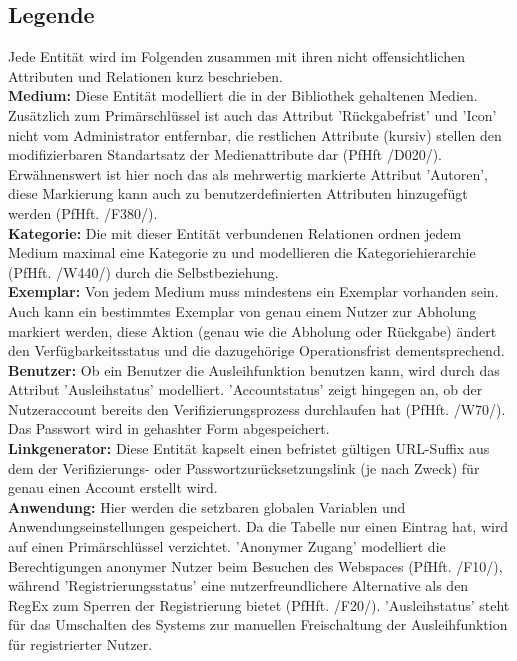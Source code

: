 \documentclass{article}
\begin{document}
\subsection{Legende}
Jede Entität wird im Folgenden zusammen mit ihren nicht offensichtlichen Attributen und Relationen kurz beschrieben.\\
\textbf{Medium:} Diese Entität modelliert die in der Bibliothek gehaltenen Medien. Zusätzlich zum Primärschlüssel ist auch das Attribut 'Rückgabefrist' und 'Icon' nicht vom Administrator entfernbar, die restlichen Attribute (kursiv) stellen den modifizierbaren Standartsatz der Medienattribute dar (PfHft /D020/). Erwähnenswert ist hier noch das als mehrwertig markierte Attribut 'Autoren', diese Markierung kann auch zu benutzerdefinierten Attributen hinzugefügt werden (PfHft. /F380/).\\
\textbf{Kategorie:} Die mit dieser Entität verbundenen Relationen ordnen jedem Medium maximal eine Kategorie zu und modellieren die Kategoriehierarchie (PfHft. /W440/) durch die Selbstbeziehung.\\
\textbf{Exemplar:} Von jedem Medium muss mindestens ein Exemplar vorhanden sein. Auch kann ein bestimmtes Exemplar von genau einem Nutzer zur Abholung markiert werden, diese Aktion (genau wie die Abholung oder Rückgabe) ändert den Verfügbarkeitsstatus und die dazugehörige Operationsfrist dementsprechend. \\
\textbf{Benutzer:} Ob ein Benutzer die Ausleihfunktion benutzen kann, wird durch das Attribut 'Ausleihstatus' modelliert. 'Accountstatus' zeigt hingegen an, ob der Nutzeraccount bereits den Verifizierungsprozess durchlaufen hat (PfHft. /W70/). Das Passwort wird in gehashter Form abgespeichert. \\
\textbf{Linkgenerator:} Diese Entität kapselt einen befristet gültigen URL-Suffix aus dem der Verifizierungs- oder Passwortzurücksetzungslink (je nach Zweck) für genau einen Account erstellt wird.\\
\textbf{Anwendung:} Hier werden die setzbaren globalen Variablen und Anwendungseinstellungen gespeichert. Da die Tabelle nur einen Eintrag hat, wird auf einen Primärschlüssel verzichtet. 'Anonymer Zugang' modelliert die Berechtigungen anonymer Nutzer beim Besuchen des Webspaces (PfHft. /F10/), während 'Registrierungsstatus' eine nutzerfreundlichere Alternative als den RegEx zum Sperren der Registrierung bietet (PfHft. /F20/). 'Ausleihstatus' steht für das Umschalten des Systems zur manuellen Freischaltung der Ausleihfunktion für registrierter Nutzer. \\
\end{document}
